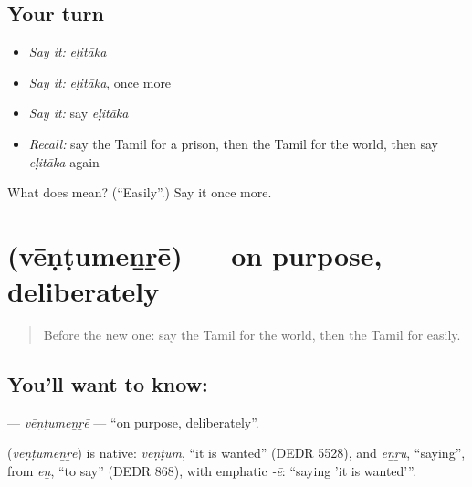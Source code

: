 \subsection*{Your turn}
\begin{itemize}
\raggedright
  \item \emph{Say it:} \emph{eḷitāka}
  \item \emph{Say it:} \emph{eḷitāka}, once more
  \item \emph{Say it:} say \emph{eḷitāka}
  \item \emph{Recall:} say the Tamil for a prison, then the Tamil for the world, then say \emph{eḷitāka} again
\end{itemize}

\begin{tcolorbox}[breakable,colback=teal!4,colframe=teal!35!black,title={Before you move on}]
What does  mean? (\textquotedblleft{}Easily\textquotedblright{}.) Say it once more.
\end{tcolorbox}
\section[\texorpdfstring{\ta{வேண்டுமென்றே} (vēṇṭumeṉṟē)}{வேண்டுமென்றே (vēṇṭumeṉṟē)}]{ (vēṇṭumeṉṟē) — on purpose, deliberately}

\label{lesson:TA-C266-ventumenre}



\begin{quote}
Before the new one: say the Tamil for the world, then the Tamil for easily.
\end{quote}

\subsection*{You'll want to know: }
\textbf{} — \emph{vēṇṭumeṉṟē} — \textquotedblleft{}on purpose, deliberately\textquotedblright{}.

\begin{cousinweb}
\textbf{} (\emph{vēṇṭumeṉṟē}) is native: \emph{vēṇṭum}, \textquotedblleft{}it is wanted\textquotedblright{} (DEDR 5528), and \emph{eṉṟu}, \textquotedblleft{}saying\textquotedblright{}, from \emph{eṉ}, \textquotedblleft{}to say\textquotedblright{} (DEDR 868), with emphatic \emph{-ē}: \textquotedblleft{}saying 'it is wanted'\textquotedblright{}.
\end{cousinweb}

